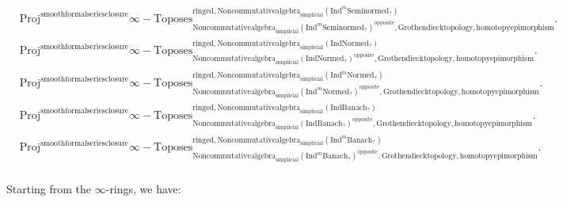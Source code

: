 \documentclass[11pt]{book}
\theoremstyle{definition}
\numberwithin{equation}{section}
\begin{document}
\begin{align}
&\mathrm{Proj}^\text{smoothformalseriesclosure}\infty-\mathrm{Toposes}^{\mathrm{ringed},\mathrm{Noncommutativealgebra}_{\mathrm{simplicial}}(\mathrm{Ind}^m\mathrm{Seminormed}_?)}_{\mathrm{Noncommutativealgebra}_{\mathrm{simplicial}}(\mathrm{Ind}^m\mathrm{Seminormed}_?)^\mathrm{opposite},\mathrm{Grothendiecktopology,homotopyepimorphism}}.\\
&\mathrm{Proj}^\text{smoothformalseriesclosure}\infty-\mathrm{Toposes}^{\mathrm{ringed},\mathrm{Noncommutativealgebra}_{\mathrm{simplicial}}(\mathrm{Ind}\mathrm{Normed}_?)}_{\mathrm{Noncommutativealgebra}_{\mathrm{simplicial}}(\mathrm{Ind}\mathrm{Normed}_?)^\mathrm{opposite},\mathrm{Grothendiecktopology,homotopyepimorphism}}.\\
&\mathrm{Proj}^\text{smoothformalseriesclosure}\infty-\mathrm{Toposes}^{\mathrm{ringed},\mathrm{Noncommutativealgebra}_{\mathrm{simplicial}}(\mathrm{Ind}^m\mathrm{Normed}_?)}_{\mathrm{Noncommutativealgebra}_{\mathrm{simplicial}}(\mathrm{Ind}^m\mathrm{Normed}_?)^\mathrm{opposite},\mathrm{Grothendiecktopology,homotopyepimorphism}}.\\
&\mathrm{Proj}^\text{smoothformalseriesclosure}\infty-\mathrm{Toposes}^{\mathrm{ringed},\mathrm{Noncommutativealgebra}_{\mathrm{simplicial}}(\mathrm{Ind}\mathrm{Banach}_?)}_{\mathrm{Noncommutativealgebra}_{\mathrm{simplicial}}(\mathrm{Ind}\mathrm{Banach}_?)^\mathrm{opposite},\mathrm{Grothendiecktopology,homotopyepimorphism}}.\\
&\mathrm{Proj}^\text{smoothformalseriesclosure}\infty-\mathrm{Toposes}^{\mathrm{ringed},\mathrm{Noncommutativealgebra}_{\mathrm{simplicial}}(\mathrm{Ind}^m\mathrm{Banach}_?)}_{\mathrm{Noncommutativealgebra}_{\mathrm{simplicial}}(\mathrm{Ind}^m\mathrm{Banach}_?)^\mathrm{opposite},\mathrm{Grothendiecktopology,homotopyepimorphism}}.\\ 
\end{align}

\indent Starting from the $\infty$-rings, we have:\\
\end{document}
